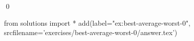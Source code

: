 
\begin{ex} 
  \label{ex:best-average-worst-0}
  
  \qed
\end{ex} 
\begin{python0}
from solutions import *
add(label="ex:best-average-worst-0",
    srcfilename='exercises/best-average-worst-0/answer.tex') 
\end{python0}
